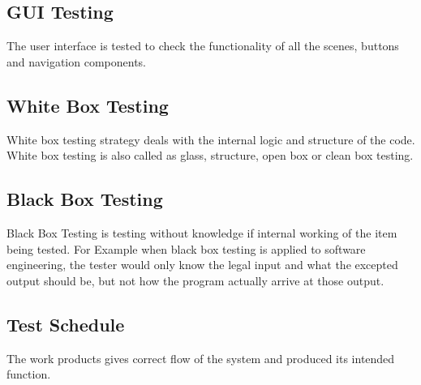 \documentclass[oneside,a4paper,12pt]{report}
\begin{document}
\subsection{GUI Testing}
\hspace*{0.3in}The user interface is tested to check the functionality of all the scenes, buttons and navigation components.
\subsection{White Box Testing}
\hspace*{0.3in}White box testing strategy deals with the internal logic and structure of the code. White box testing is also called as glass, structure, open box or clean box testing.
\subsection{Black Box Testing}
\hspace*{0.3in}Black Box Testing is testing without knowledge if internal working of the item being tested. For Example when black box testing is applied to software engineering, the tester would only know the legal input and what the excepted output should be, but not how the program actually arrive at those output.
\subsection{Test Schedule}
The work products gives correct flow of the system and produced its intended function.
\end{document}
